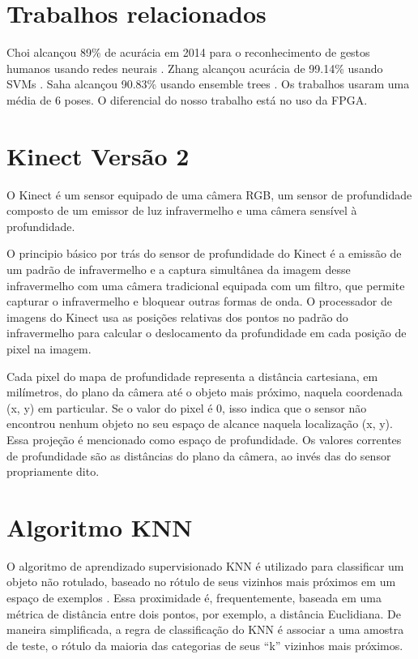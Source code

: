 \documentclass[12pt]{article}
\begin{document}
\section{Trabalhos relacionados}

Choi alcançou 89\% de acurácia em 2014 para o reconhecimento de gestos humanos
usando redes neurais \cite{choi2014design}. Zhang alcançou acurácia de 99.14\%
usando SVMs \cite{zhang2014novel}. Saha alcançou 90.83\% usando ensemble trees
\cite{saha2014study}. Os trabalhos usaram uma média de 6 poses. O diferencial
do nosso trabalho está no uso da FPGA.

\section{Kinect Vers\~ao 2} \label{sec:kinectversion2}

O Kinect é um sensor equipado de uma câmera RGB, um sensor de profundidade
composto de um emissor de luz infravermelho e uma câmera sensível à
profundidade.

O principio básico por trás do sensor de profundidade do Kinect é a emissão de
um padrão de infravermelho e a captura simultânea da imagem desse infravermelho
com uma câmera tradicional equipada com um filtro, que permite capturar o 
infravermelho e bloquear outras formas de onda. O processador de imagens do 
Kinect usa as posições relativas dos pontos 
no padrão do infravermelho para calcular o deslocamento da profundidade em cada
posição de pixel na imagem.

Cada pixel do mapa de profundidade representa a distância cartesiana, em 
milímetros, do plano da câmera até o objeto mais próximo, naquela coordenada
(x, y) em particular. Se o valor do pixel é 0, isso indica que o sensor não 
encontrou nenhum objeto no seu espaço de alcance naquela localização (x, y).
Essa projeção é mencionado como espaço de profundidade. Os valores correntes de
profundidade são as distâncias do plano da câmera, ao invés das do sensor 
propriamente dito.

\section{Algoritmo KNN}

O algoritmo de aprendizado supervisionado KNN é utilizado para classificar um
objeto não rotulado, baseado no rótulo de seus vizinhos mais próximos em um
espaço de exemplos \cite{Andersson:2014}. Essa proximidade é, frequentemente,
baseada em uma métrica de distância entre dois pontos, por  exemplo, a
distância Euclidiana. De maneira simplificada, a regra de classificação do KNN
é associar a uma amostra de teste, o rótulo da maioria das categorias de seus
``k'' vizinhos mais próximos.
\end{document}
